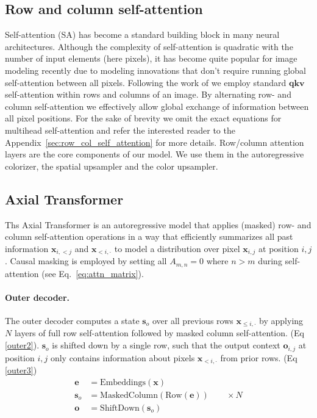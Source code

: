 \documentclass{article} \usepackage{iclr2021_conference,times}
\newcommand{\bb}[1]{\mathbf{#1}}
\newcommand{\be}{\bb{e}}
\newcommand{\bx}{\bb{x}}
\newcommand{\bv}{\bb{v}}
\newcommand{\bk}{\bb{k}}
\newcommand{\bq}{\bb{q}}
\newcommand{\bo}{\bb{o}}
\newcommand{\bs}{\mathbf{s}}
\begin{document}
\subsection{Row and column self-attention}
\label{self_attention}

Self-attention (SA) has become a standard building block in many neural architectures. Although the complexity of self-attention is quadratic with the number of input elements (here pixels), it has become quite popular for image modeling recently \citep{parmar2018image, weissenborn2019scaling} due to modeling innovations that don't require running global self-attention between all pixels. Following the work of \citep{ho2019axial} we employ standard $\bq \bk \bv$ self-attention \citep{vaswani2017attention} within rows and columns of an image. By alternating row- and column self-attention we effectively allow global exchange of information between all pixel positions. For the sake of brevity we omit the exact equations for multihead self-attention and refer the interested reader to the Appendix~\ref{sec:row_col_self_attention} for more details. Row/column attention layers are the core components of our model. We use them in the autoregressive colorizer, the spatial upsampler and the color upsampler.

\subsection{Axial Transformer}
\label{autorec_base}

Ths Axial Transformer \citep{ho2019axial} is an autoregressive model that applies (masked) row- and column self-attention operations in a way that efficiently summarizes all past information $\bx_{i,<j}$ and $\bx_{<i,\cdot}$ to model a distribution over pixel $\bx_{i,j}$ at position $i,j$. Causal masking is employed by setting all $A_{m,n} = 0$ where $n > m$ during self-attention (see Eq.~\ref{eq:attn_matrix}).

\paragraph{Outer decoder.} The outer decoder computes a state $\bs_{o}$ over all previous rows $\bx_{\leq i,\cdot}$ by applying $N$ layers of full row self-attention followed by masked column self-attention. (Eq \ref{outer2}).  $\bs_{o}$  is shifted down by a single row, such that the output context $\bo_{i, j}$ at position $i,j$ only contains information about pixels $\bx_{<i, \cdot}$ from prior rows. (Eq \ref{outer3})
\begin{align}
    \be &= \text{Embeddings}(\bx) \label{outer1}\\
    \bs_{o} &= \text{MaskedColumn}(\text{Row}(\be)) \qquad \times N \label{outer2} \\
    \bo &= \text{ShiftDown}(\bs_{o}) \label{outer3}
\end{align}
\end{document}
